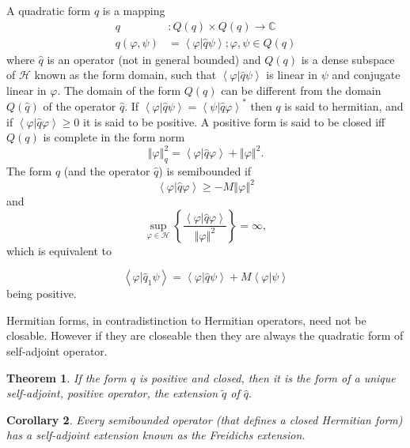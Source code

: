 \documentclass[aps,preprint]{revtex4}%
\newtheorem{theorem}{Theorem}
\newtheorem{corollary}[theorem]{Corollary}
\begin{document}
A quadratic form $q$ is a mapping
\begin{align*}
q  &  :Q\left(  q\right)  \times Q\left(  q\right)  \rightarrow\mathbb{C}\\
q\left(  \varphi,\psi\right)   &  =\left\langle \left.  \varphi\right\vert
\hat{q}\psi\right\rangle ;\varphi,\psi\in Q\left(  q\right)
\end{align*}
where $\hat{q}$ is an operator (not in general bounded) and $Q\left(
q\right)  $ is a dense subspace of $\mathcal{H}$ known as the form domain,
such that $\left\langle \left.  \varphi\right\vert \hat{q}\psi\right\rangle $
is linear in $\psi$ and conjugate linear in $\varphi.$ The domain of the form
$Q\left(  q\right)  $ can be different from the domain $Q\left(  \hat
{q}\right)  $ of the operator $\hat{q}$. If $\left\langle \left.
\varphi\right\vert \hat{q}\psi\right\rangle =\left\langle \left.
\psi\right\vert \hat{q}\varphi\right\rangle ^{\ast}$ then $q$ is said to
hermitian, and if $\left\langle \left.  \varphi\right\vert \hat{q}%
\varphi\right\rangle \geq0$ it is said to be positive. A positive form is said
to be closed iff $Q\left(  q\right)  $ is complete in the form norm%
\[
\left\Vert \varphi\right\Vert _{q}^{2}=\left\langle \left.  \varphi\right\vert
\hat{q}\varphi\right\rangle +\left\Vert \varphi\right\Vert ^{2}.
\]
The form $q$ (and the operator $\hat{q}$) is semibounded if
\[
\left\langle \left.  \varphi\right\vert \hat{q}\varphi\right\rangle
\geq-M\left\Vert \varphi\right\Vert ^{2}%
\]
and
\[
\sup_{\varphi\in\mathcal{H}}\left\{  \frac{\left\langle \left.  \varphi
\right\vert \hat{q}\varphi\right\rangle }{\left\Vert \varphi\right\Vert ^{2}%
}\right\}  =\infty,
\]
which is equivalent to%

\[
\left\langle \left.  \varphi\right\vert \hat{q}_{1}\psi\right\rangle
=\left\langle \left.  \varphi\right\vert \hat{q}\psi\right\rangle
+M\left\langle \left.  \varphi\right\vert \psi\right\rangle
\]
being positive.

Hermitian forms, in contradistinction to Hermitian operators, need not be
closable. However if they are closeable then they are always the quadratic
form of self-adjoint operator.

\begin{theorem}
If the form $q$ is positive and closed, then it is the form of a unique
self-adjoint, positive operator, the extension $\tilde{q}$ of $\hat{q}.$
\end{theorem}

\begin{corollary}
Every semibounded operator (that defines a closed Hermitian form) has a
self-adjoint extension known as the Freidichs extension.
\end{corollary}
\end{document}
